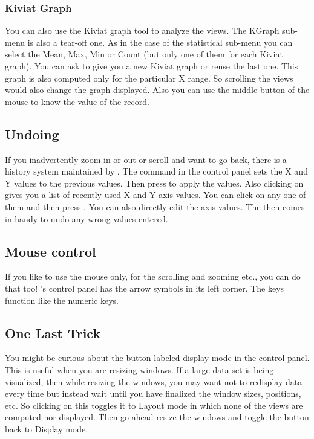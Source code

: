 \subsubsection{Kiviat Graph}

	
You can also use the Kiviat graph tool to analyze the views. The
KGraph sub-menu is also a tear-off one. As in the case of the
statistical sub-menu you can select the Mean, Max, Min or Count (but
only one of them for each Kiviat graph). You can ask \Devise to give
you a new Kiviat graph or reuse the last one. This graph is also
computed only for the particular X range. So scrolling the views would
also change the graph displayed. Also you can use the middle button of
the mouse to know the value of the record.

\subsection{Undoing}


If you inadvertently zoom in or out or scroll and want to go back,
there is a history system maintained by \Devise. The 
command in the control panel sets the X and Y values to the previous
values. Then press  to apply the values. Also clicking on
 gives you a list of recently used X and Y axis
values. You can click on any one of them and then press
. You can also directly edit the axis values. The
 then comes in handy to undo any wrong values entered.

\subsection{Mouse control}

If you like to use the mouse only, for the scrolling and zooming etc.,
you can do that too! \Devise's control panel has the arrow symbols in
its left corner. The keys function like the numeric keys.

\subsection{One Last Trick}

You might be curious about the button labeled display mode in the
control panel. This is useful when you are resizing windows. If a
large data set is being visualized, then while resizing the windows,
you may want \Devise not to redisplay data every time but instead wait
until you have finalized the window sizes, positions, etc. So clicking
on this toggles it to Layout mode in which none of the views are
computed nor displayed. Then go ahead resize the windows and toggle
the button back to Display mode.

